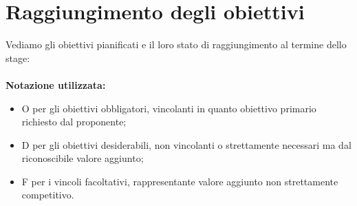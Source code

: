 \section{Raggiungimento degli obiettivi}
Vediamo gli obiettivi pianificati e il loro stato di raggiungimento al termine dello stage: 
\\\\
\textbf{Notazione utilizzata:}
\\
\begin{itemize}
    \item O per gli obiettivi obbligatori, vincolanti in quanto obiettivo primario richiesto dal proponente;
    \item D per gli obiettivi desiderabili, non vincolanti o strettamente necessari ma dal riconoscibile valore aggiunto;
    \item F per i vincoli facoltativi, rappresentante valore aggiunto non strettamente competitivo.
\end{itemize}
\leavevmode\newline
